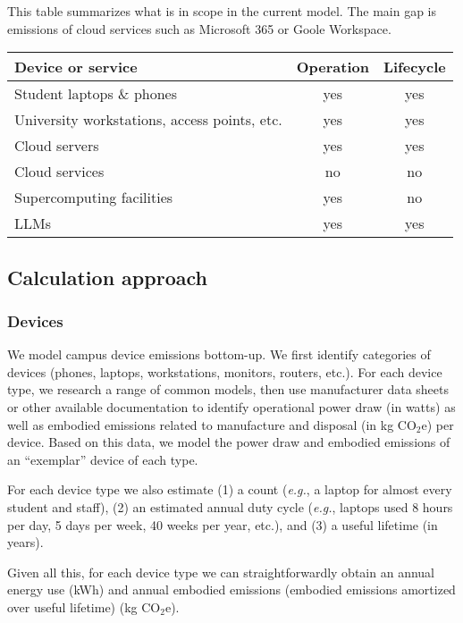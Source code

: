 \documentclass[11pt]{article}
\newcommand{\eg}{{\em e.g.}}
\begin{document}
This table summarizes what is in scope in the current model. The main gap is emissions of cloud services such as Microsoft 365 or Goole Workspace.

\begin{center}
  \begin{tabular}{|l|c|c|}
  \hline
  \textbf{Device or service} & \textbf{Operation} & \textbf{Lifecycle} \\ \hline
  Student laptops \& phones & yes & yes \\
  University workstations, access points, etc. & yes & yes \\
  Cloud servers & yes & yes \\
  Cloud services & no & no \\
  Supercomputing facilities & yes & no \\
  LLMs & yes & yes \\ \hline
  \end{tabular}
  \label{tab:scopes}
  \end{center}
  

\subsection{Calculation approach}

\subsubsection*{Devices}

We model campus device emissions bottom-up. We first identify categories of devices (phones, laptops, workstations, monitors, routers, etc.). For each device type, we research a range of common models, then use manufacturer data sheets or other available documentation to identify operational power draw (in watts) as well as embodied emissions related to manufacture and disposal (in kg CO$_2$e) per device. Based on this data, we model the power draw and embodied emissions of an ``exemplar'' device of each type.

For each device type we also estimate (1) a count (\eg, a laptop for almost every student and staff), (2) an estimated annual duty cycle (\eg, laptops used 8 hours per day, 5 days per week, 40 weeks per year, etc.), and (3) a useful lifetime (in years).

Given all this, for each device type we can straightforwardly obtain an annual energy use (kWh) and annual embodied emissions (embodied emissions amortized over useful lifetime) (kg CO$_2$e).
\end{document}
